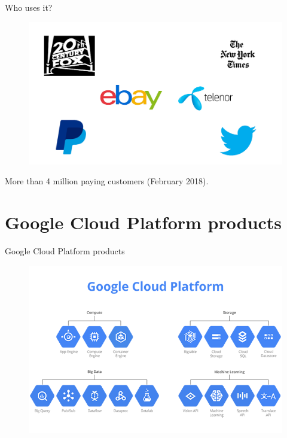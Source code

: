 \documentclass{beamer}
\begin{document}
\begin{frame}[fragile]{Who uses it?}
\begin{figure}[H]
  \centering
  \includegraphics[scale=0.35]{../img/logos.png}
\end{figure}
More than 4 million paying customers (February 2018).
\end{frame}

\section{Google Cloud Platform products}

\begin{frame}[fragile]{Google Cloud Platform products}
\begin{figure}[H]
  \centering
  \includegraphics[width = \textwidth]{../img/cloud_products_big}
\end{figure}

\end{frame}
\end{document}
